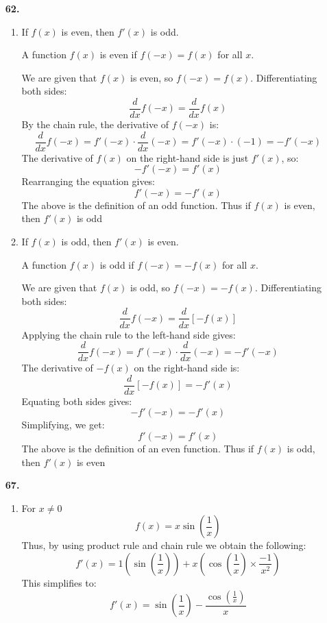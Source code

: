 \documentclass[12pt]{article}
\begin{document}
\begin{enumerate}[start=1,label={\bfseries. },leftmargin=1in]
    \item [\textbf{62. }]
    \begin{enumerate}
    \item If \( f(x) \) is even, then \( f'(x) \) is odd.

    A function \( f(x) \) is even if \( f(-x) = f(x) \) for all \( x \).

    We are given that \( f(x) \) is even, so \( f(-x) = f(x) \). Differentiating both sides:
    \[
    \frac{d}{dx} f(-x) = \frac{d}{dx} f(x)
    \]
    By the chain rule, the derivative of \( f(-x) \) is:
    \[
    \frac{d}{dx} f(-x) = f'(-x) \cdot \frac{d}{dx}(-x) = f'(-x) \cdot (-1) = -f'(-x)
    \]
    The derivative of \( f(x) \) on the right-hand side is just \( f'(x) \), so:
    \[
    -f'(-x) = f'(x)
    \]
    Rearranging the equation gives:
    \[
    f'(-x) = -f'(x)
    \]
    The above is the definition of an odd function. Thus if $f(x)$ is even, then $f'(x)$ is odd
    \bigbreak

    \item If \( f(x) \) is odd, then \( f'(x) \) is even.

    A function \( f(x) \) is odd if \( f(-x) = -f(x) \) for all \( x \).

    We are given that \( f(x) \) is odd, so \( f(-x) = -f(x) \). Differentiating both sides:
    \[
    \frac{d}{dx} f(-x) = \frac{d}{dx} [-f(x)]
    \]
    Applying the chain rule to the left-hand side gives:
    \[
    \frac{d}{dx} f(-x) = f'(-x) \cdot \frac{d}{dx}(-x) = -f'(-x)
    \]
    The derivative of \( -f(x) \) on the right-hand side is:
    \[
    \frac{d}{dx} [-f(x)] = -f'(x)
    \]
    Equating both sides gives:
    \[
    -f'(-x) = -f'(x)
    \]
    Simplifying, we get:
    \[
    f'(-x) = f'(x)
    \]
    The above is the definition of an even function. Thus if $f(x)$ is odd, then $f'(x)$ is even
    \end{enumerate}
\newpage
    \item [\textbf{67.}] 
    \begin{enumerate}
        \item For $x\neq 0$
        \[
        f(x) = x \sin\left(\frac{1}{x}\right) 
        \]
        Thus, by using product rule and chain rule we obtain the following:
        \[
        f'(x) = 1\left(\sin\left(\frac{1}{x}\right)\right) + x\left(\cos\left(\frac{1}{x}\right) \times \frac{-1}{x^2}\right)
        \]
        This simplifies to:
        \[
        f'(x) =\sin\left(\frac{1}{x}\right) -\frac{\cos\left(\frac{1}{x}\right)}{x}
        \]


\end{enumerate}
\end{enumerate}
\end{document}
